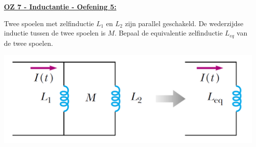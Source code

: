 \textbf{\underline{OZ 7 - Inductantie - Oefening 5:}}
\vspace{0.5cm}

Twee spoelen met zelfinductie $L_1$ en $L_2$ zijn parallel geschakeld. De wederzijdse inductie tussen de twee spoelen is $M$. Bepaal de equivalentie zelfinductie $L_{eq}$ van de twee spoelen.

\begin{center}
    \includegraphics[scale = 0.3]{oz07/resources/Oz7Oef5.png}
\end{center}

\begin{description}[labelwidth=1.5cm, leftmargin=!]
    \item[Geg. :] 
    \item[Gevr. :] 
    \item[Opl. :]
\end{description}

\vspace{1cm}